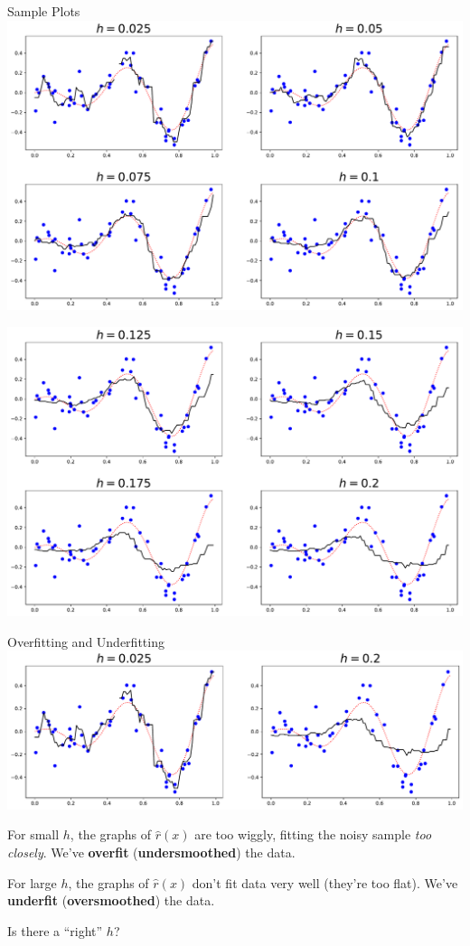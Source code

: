 \documentclass[xcolor={dvipsnames}]{beamer}
\renewcommand{\hat}{\widehat}
\begin{document}
\begin{frame}{Sample Plots}%
    \includegraphics[scale=0.32]{la_four_plots_1.pdf}
\end{frame}

\begin{frame}{}%
    \includegraphics[scale=0.32]{la_four_plots_2.pdf}
\end{frame}

\begin{frame}{Overfitting and Underfitting}
    \setlength\parskip{1em}
    \includegraphics[scale=0.32]{sliding_window_two_plots.pdf}

    For small $h$, the graphs of $\hat r(x)$ are too wiggly,
    fitting the noisy sample \emph{too closely}.
    We've \textbf{overfit} (\textbf{undersmoothed}) the data.


    For large $h$, the graphs of $\hat{r}(x)$ don't fit data very well (they're too flat).
    We've \textbf{underfit} (\textbf{oversmoothed}) the data.

    Is there a ``right'' $h$?
\end{frame}
\end{document}
